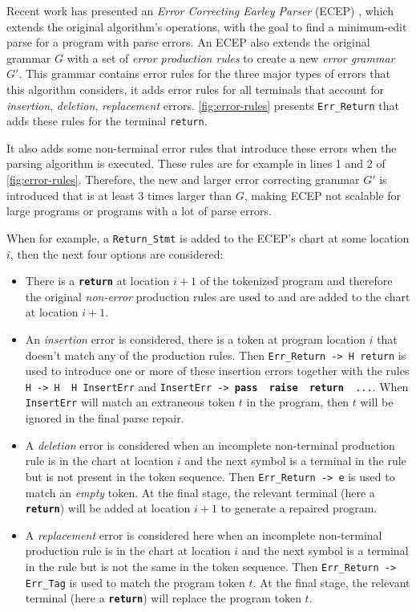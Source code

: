  Recent work has presented an \emph{Error
Correcting Earley Parser} (ECEP) \citep{?}, which extends the original
algorithm's operations, with the goal to find a minimum-edit parse for a program
with parse errors. An ECEP also extends the original grammar $G$ with a set of
\emph{error production rules} to create a new \emph{error grammar} $G'$. This
grammar contains error rules for the three major types of errors that this
algorithm considers, \ie it adds error rules for all terminals that account for
\emph{insertion}, \emph{deletion}, \emph{replacement} errors.
\autoref{fig:error-rules} presents \texttt{Err\_Return} that adds these rules
for the terminal \texttt{return}.

It also adds some non-terminal error rules that introduce these errors when the
parsing algorithm is executed. These rules are for example in lines 1 and 2 of
\autoref{fig:error-rules}. Therefore, the new and larger error correcting
grammar $G'$ is introduced that is at least 3 times larger than $G$, making ECEP
not scalable for large programs or programs with a lot of parse errors.

When for example, a \texttt{Return\_Stmt} is added to the ECEP's chart at some
location $i$, then the next four options are considered:
\begin{itemize}
  \item There is a \texttt{\bfseries return} at location $i+1$ of the tokenized
  program and therefore the original \emph{non-error} production rules are used
  to and are added to the chart at location $i+1$.
  \item An \emph{insertion} error is considered, \ie there is a token at program
  location $i$ that doesn't match any of the production rules. Then
  \texttt{Err\_Return -> H return} is used to introduce one or more of these
  insertion errors together with the rules \texttt{H -> H \textbar\ H InsertErr}
  and \texttt{InsertErr -> \textbf{pass} \textbar\ \textbf{raise} \textbar\
  \textbf{return} \textbar\ ...}. When \texttt{InsertErr} will match an
  extraneous token $t$ in the program, then $t$ will be ignored in the final
  parse repair.
  \item A \emph{deletion} error is considered when an incomplete non-terminal
  production rule is in the chart at location $i$ and the next symbol is a
  terminal in the rule but is not present in the token sequence. Then
  \texttt{Err\_Return -> e} is used to match an \emph{empty} token. At the final
  stage, the relevant terminal (here a \texttt{\textbf{return}}) will be added
  at location $i+1$ to generate a repaired program.
  \item A \emph{replacement} error is considered here when an incomplete
  non-terminal production rule is in the chart at location $i$ and the next
  symbol is a terminal in the rule but is not the same in the token sequence.
  Then \texttt{Err\_Return -> Err\_Tag} is used to match the program token $t$.
  At the final stage, the relevant terminal (here a \texttt{\textbf{return}})
  will replace the program token $t$.
\end{itemize}

